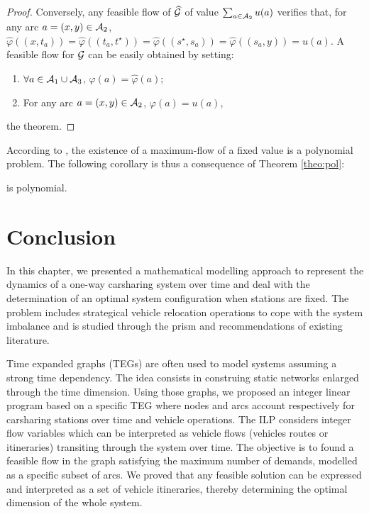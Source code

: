 \begin{proof}
\medskip
Conversely, any feasible flow of $\widehat{\mathcal{G}}$ of value $\sum_{a\in \mathcal{A}_2} u(a)$ verifies
that, for any arc ${a=(x,y) \in \mathcal{A}_2}$, 
$\widehat{\varphi}((x,t_a)) = \widehat{\varphi}((t_a,t^\star)) = \widehat{\varphi}((s^\star, s_a)) = \widehat{\varphi}( (s_a,y))=u(a)$.
A feasible flow for ${\mathcal{G}}$ can be easily obtained by setting:
\begin{enumerate}
\item
$\forall a\in \mathcal{A}_1 \cup \mathcal{A}_3$, 
${\varphi}(a)=\widehat{\varphi}(a)$;

\item
For any arc $a=(x,y)\in \mathcal{A}_2$, $\varphi(a)=u(a)$,
\end{enumerate}
the theorem.
\end{proof}

According to \cite{ahuja_network_1993}, the existence of a maximum-flow of a fixed value is a polynomial problem.
The following corollary is thus a consequence of Theorem \ref{theo:pol}:
\begin{corollary}
\emph{\SDPALLDEMANDS} is polynomial.
\end{corollary}

\section{Conclusion}
In this chapter, we presented a mathematical modelling approach to represent the dynamics of a one-way carsharing system over time and deal with the determination of an optimal system configuration when stations are fixed.
The problem includes strategical vehicle relocation operations to cope with the system imbalance and  is studied through the prism and recommendations of existing literature.

\medskip
Time expanded graphs (TEGs) are often used to model systems assuming a strong time dependency.
The idea consists in construing static networks enlarged through the time dimension.
Using those graphs, we proposed an integer linear program {\SDP} based on a specific TEG where nodes and arcs account respectively for carsharing stations over time and vehicle operations.
The ILP considers integer flow variables which can be interpreted as vehicle flows (vehicles routes or itineraries) transiting through the system over time.
The objective is to found a feasible flow in the graph satisfying the maximum number of demands, modelled as a specific subset of arcs.
We proved that any feasible solution can be expressed and interpreted as a set of vehicle itineraries, thereby determining the optimal dimension of the whole system.

